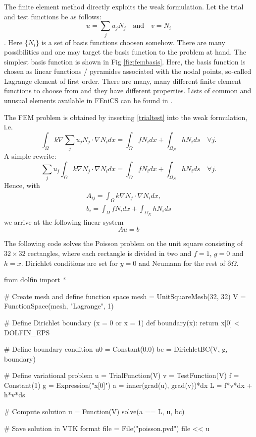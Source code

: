 The finite element method directly exploits the weak formulation. 
Let the trial and test functions be as follows:  
\begin{equation}
\label{trialtest}
u = \sum_j u_j N_j \quad \text{and} \quad v=N_i
\end{equation}
	. Here $\{N_i\}$ is a set of basis functions choosen somehow. 
There are many possibilities and one may target the basis function to the problem at hand. 
The simplest basis function is shown in 
Fig \ref{fig:fembasis}. Here, the basis function is chosen as linear functions / pyramides associated with the nodal points, 
so-called Lagrange element of first order.  
There are many, many different finite element functions to choose from and they have different properties. 
Lists of common and unusual elements available in FEniCS can be found in 
\cite{logg2012automated}. 

The FEM problem is obtained by inserting \eqref{trialtest} into the weak formulation, i.e.   
\[
\int_\Omega k \nabla \sum_j u_j N_j  \cdot \nabla N_i dx = \int_\Omega f N_i dx + \int_{\Omega_N} h N_i ds  \quad \forall j .    
\]
A simple rewrite: 
\[
\sum_j u_j  \int_\Omega k \nabla  N_j  \cdot \nabla N_i dx = \int_\Omega f N_i dx + \int_{\Omega_N} h N_i ds \quad \forall j.    
\]
Hence, with  
\begin{eqnarray*}
A_{ij} = \int_\Omega k \nabla  N_j  \cdot \nabla N_i dx, \\  
b_i = \int_\Omega f N_i dx + \int_{\Omega_N} h N_i ds 
\end{eqnarray*}
we arrive at the following linear system 
\[
A u = b 
\]

The following code solves the Poisson problem on the unit square
consisting of $32\times 32$ rectangles, where each rectangle is divided
in two and $f=1$, $g=0$ and $h=x$. Dirichlet conditions are set 
for $y=0$ and Neumann for the rest of $\partial \Omega$.  

\begin{python}
from dolfin import *

# Create mesh and define function space
mesh = UnitSquareMesh(32, 32)
V = FunctionSpace(mesh, "Lagrange", 1)

# Define Dirichlet boundary (x = 0 or x = 1)
def boundary(x): return x[0] < DOLFIN_EPS 

# Define boundary condition
u0 = Constant(0.0)
bc = DirichletBC(V, g, boundary)

# Define variational problem
u = TrialFunction(V)
v = TestFunction(V)
f = Constant(1)
g = Expression("x[0]")
a = inner(grad(u), grad(v))*dx
L = f*v*dx + h*v*ds

# Compute solution
u = Function(V)
solve(a == L, u, bc)

# Save solution in VTK format
file = File("poisson.pvd")
file << u
\end{python}

